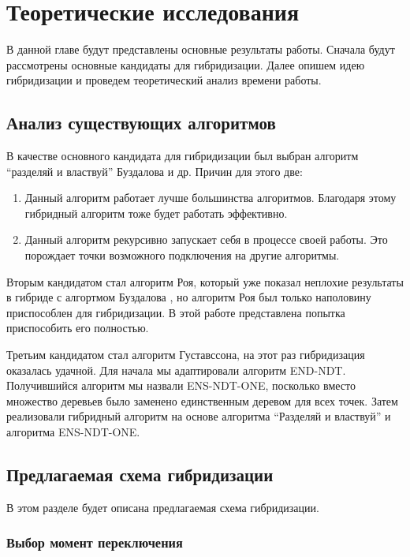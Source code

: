 \chapter{Теоретические исследования}
\label{chapter2}

В данной главе будут представлены основные результаты работы. Сначала будут рассмотрены основные кандидаты для гибридизации. Далее опишем идею гибридизации и проведем теоретический анализ времени работы.

\section{Анализ существующих алгоритмов}

В качестве основного кандидата для гибридизации был выбран алгоритм ``разделяй и властвуй'' Буздалова и др. Причин для этого две:

\begin{enumerate}
 \item Данный алгоритм работает лучше большинства алгоритмов. Благодаря этому гибридный алгоритм тоже будет работать эффективно.
 \item Данный алгоритм рекурсивно запускает себя в процессе своей работы. Это порождает точки возможного подключения на другие алгоритмы.
\end{enumerate}

Вторым кандидатом стал алгоритм Роя, который уже показал неплохие результаты в гибриде с алгортмом Буздалова  \cite{Markina}, но алгоритм Роя был только наполовину приспособлен для гибридизации. В этой работе представлена попытка приспособить его полностью. 

Третьим кандидатом стал алгоритм Густавссона, на этот раз гибридизация оказалась удачной. Для начала мы адаптировали алгоритм END-NDT. Получившийся алгоритм мы назвали ENS-NDT-ONE, посколько вместо множество деревьев было заменено единственным деревом для всех точек. Затем реализовали гибридный алгоритм на основе алгоритма ``Разделяй и властвуй'' и алгоритма ENS-NDT-ONE.

\section{Предлагаемая схема гибридизации}

В этом разделе будет описана предлагаемая схема гибридизации.

\subsection{Выбор момент переключения}

